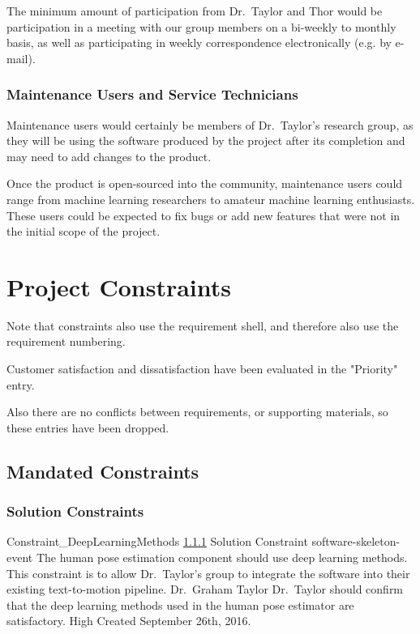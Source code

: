 \documentclass{scrreprt}
\begin{document}
The minimum amount of participation from Dr.\ Taylor and Thor would be
participation in a meeting with our group members on a bi-weekly to monthly
basis, as well as participating in weekly correspondence electronically (e.g.
by e-mail).

\subsection{Maintenance Users and Service Technicians}

Maintenance users would certainly be members of Dr.\ Taylor's research group,
as they will be using the software produced by the project after its completion
and may need to add changes to the product.

Once the product is open-sourced into the community, maintenance users could
range from machine learning researchers to amateur machine learning
enthusiasts. These users could be expected to fix bugs or add new features that
were not in the initial scope of the project.

\chapter{Project Constraints}

Note that constraints also use the requirement shell, and therefore also use
the requirement numbering.

Customer satisfaction and dissatisfaction have been evaluated in the "Priority" entry.

Also there are no conflicts between requirements, or supporting materials, so
these entries have been dropped.

\section{Mandated Constraints}

\subsection{Solution Constraints}
\label{req-solution-constraint}

\requirement
{Constraint_DeepLearningMethods}
{\ref{req-solution-constraint} Solution Constraint}
{software-skeleton-event}
{The human pose estimation component should use deep learning methods.}
{This constraint is to allow Dr.\ Taylor's group to integrate the software into
 their existing text-to-motion pipeline.}
{Dr.\ Graham Taylor}
{Dr.\ Taylor should confirm that the deep learning methods used in the human
 pose estimator are satisfactory.}
{High}
{Created September 26th, 2016.}
\end{document}
